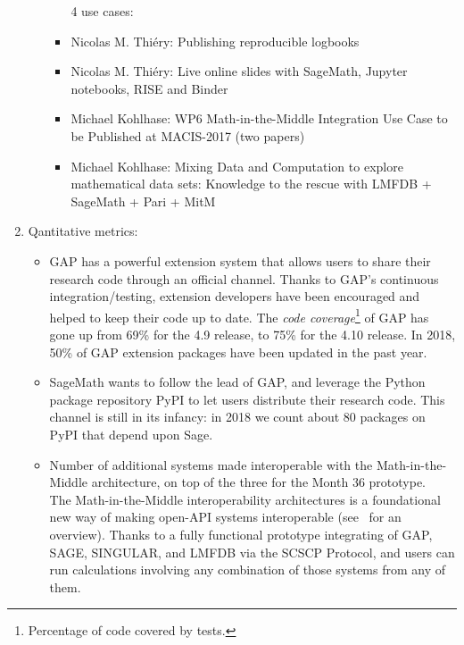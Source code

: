 \begin{enumerate}
\begin{itemize}
\begin{itemize}     
4 use cases: %
\item Nicolas M. Thiéry: Publishing reproducible logbooks 
\item Nicolas M. Thiéry: Live online slides with SageMath, Jupyter notebooks, RISE and Binder
\item Michael Kohlhase: WP6 Math-in-the-Middle Integration Use Case to be Published at MACIS-2017 (two papers) 
\item Michael Kohlhase: Mixing Data and Computation to explore mathematical data sets: Knowledge to the rescue with LMFDB + SageMath + Pari + MitM 
\end{itemize}        
\end{itemize} 
\item Qantitative metrics:
  \begin{itemize}
  \item GAP has a powerful extension system that allows users to share
    their research code through an official channel. Thanks to GAP's
    continuous integration/testing, extension developers have been
    encouraged and helped to keep their code up to date. The
    \emph{code coverage}\footnote{Percentage of code covered by
      tests.} of GAP has gone up from 69\% for the 4.9 release, to
    75\% for the 4.10 release. In 2018, 50\% of GAP extension packages
    have been updated in the past year.
  \item SageMath wants to follow the lead of GAP, and leverage the
    Python package repository PyPI to let users distribute their
    research code. This channel is still in its infancy: in 2018 we
    count about 80 packages on PyPI that depend upon Sage.
        

    \item Number of additional systems made interoperable with the Math-in-the-Middle
      architecture, on top of the three for the Month 36 prototype.\\
      The Math-in-the-Middle interoperability architectures is a foundational new way of
      making open-API systems interoperable (see~\cite{ODK-D6.5} for an overview). Thanks
      to a fully functional prototype integrating of GAP, SAGE, SINGULAR, and LMFDB via
      the SCSCP Protocol, and users can run calculations involving any combination of
      those systems from any of them.


\end{itemize}
\end{enumerate}
